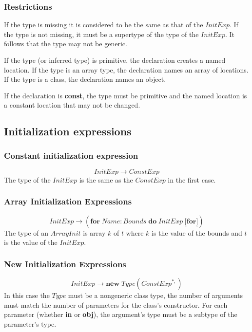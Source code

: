 \documentclass{article}%
\begin{document}
\subsubsection{Restrictions}

If the type is missing it is considered to be the same as that of the
$\mathit{InitExp}$. If the type is not missing, it must be a supertype of the
type of the $\mathit{InitExp}$. It follows that the type may not be generic.

If the type (or inferred type) is primitive, the declaration creates a named
location. If the type is an array type, the declaration names an array of
locations. If the type is a class, the declaration names an object.

If the declaration is \textbf{const}, the type must be primitive and the named
location is a constant location that may not be changed.

\subsection{Initialization expressions}

\subsubsection{Constant initialization expression}%

\[
\mathit{InitExp}\rightarrow\mathit{ConstExp}%
\]
The type of the $\mathit{InitExp}$ is the same as the $\mathit{ConstExp}$ in
the first case.

\subsubsection{Array Initialization Expressions}%

\[
\mathit{InitExp}\rightarrow\left(  \mathbf{for}\;\mathit{Name}:\mathit{Bounds}%
\;\mathbf{do}\;\mathit{InitExp}\;\underline{[}\mathbf{for}\underline{]}%
\right)
\]
The type of an $\mathit{ArrayInit}$ is array $k$ of $t$ where $k$ is the value
of the bounds and $t$ is the value of the $\mathit{InitExp}$.

\subsubsection{New Initialization Expressions}%

\[
\mathit{InitExp}\rightarrow\mathbf{new}\;\mathit{Type}(\mathit{ConstExp}%
^{\ast,})
\]
In this case the $\mathit{Type}$ must be a nongeneric class type, the number
of arguments must match the number of parameters for the class's constructor.
For each parameter (whether \textbf{in} or \textbf{obj}), the argument's type
must be a subtype of the parameter's type.
\end{document}
